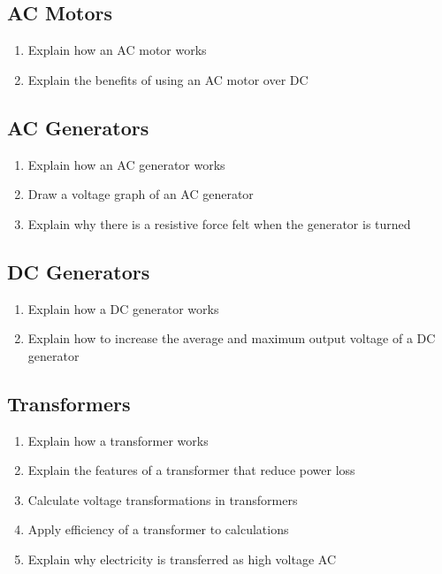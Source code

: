 \documentclass[a4paper,11pt]{article}
\begin{document}
\subsection{AC Motors}

\begin{enumerate}
\item Explain how an AC motor works
\item Explain the benefits of using an AC motor over DC
\end{enumerate}


\subsection{AC Generators}

\begin{enumerate}
\item Explain how an AC generator works
\item Draw a voltage graph of an AC generator
\item Explain why there is a resistive force felt when the generator is turned
\end{enumerate}


\subsection{DC Generators}

\begin{enumerate}
\item Explain how a DC generator works
\item Explain how to increase the average and maximum output voltage of a DC
	generator
\end{enumerate}


\subsection{Transformers}

\begin{enumerate}
\item Explain how a transformer works
\item Explain the features of a transformer that reduce power loss
\item Calculate voltage transformations in transformers
\item Apply efficiency of a transformer to calculations
\item Explain why electricity is transferred as high voltage AC
\end{enumerate}
\end{document}
